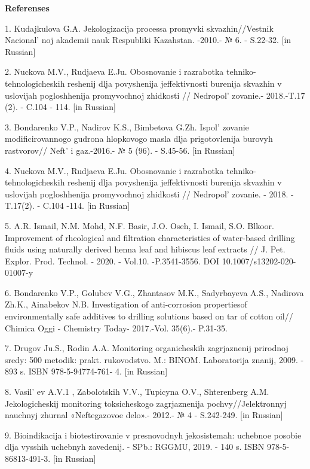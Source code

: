 \begin{center}
{\bfseries Referenses}
\end{center}

\begin{refs}
1. Kudajkulova G.A. Jekologizacija processa promyvki skvazhin//Vestnik
Nacional' noj akademii nauk Respubliki Kazahstan. -2010.-
№ 6. - S.22-32. {[}in Russian{]}

2. Nuckova M.V., Rudjaeva E.Ju. Obosnovanie i razrabotka
tehniko-tehnologicheskih reshenij dlja povy\-shenija jeffektivnosti
burenija skvazhin v uslovijah pogloshhenija promyvochnoj zhidkosti //
Nedropol' zovanie.- 2018.-T.17 (2). - C.104 - 114.
{[}in Russian{]}

3. Bondarenko V.P., Nadirov K.S., Bimbetova G.Zh.
Ispol' zovanie modificirovannogo gudrona hlopkov\-ogo masla
dlja prigotovlenija burovyh rastvorov// Neft'{} i
gaz.-2016.- № 5 (96). - S.45-56. {[}in Russian{]}

4. Nuckova M.V., Rudjaeva E.Ju. Obosnovanie i razrabotka
tehniko-tehnologicheskih reshenij dlja povy\-shenija jeffektivnosti
burenija skvazhin v uslovijah pogloshhenija promyvochnoj zhidkosti //
Nedropol' zovanie. - 2018. -T.17(2). - C.104 -114.
{[}in Russian{]}

5. A.R. Ismail, N.M. Mohd, N.F. Basir, J.O. Oseh, I. Ismail, S.O.
Blkoor. Improvement of rheological and filtration characteristics of
water-based drilling fluids using naturally derived henna leaf and
hibiscus leaf extracts // J. Pet. Explor. Prod. Technol. - 2020. -
Vol.10. -P.3541-3556. DOI 10.1007/s13202-020-01007-y

6. Bondarenko V.P., Golubev V.G., Zhantasov M.K., Sadyrbayeva A.S.,
Nadirova Zh.K., Ainabekov N.B. Investigation of anti-corrosion
propertiesof environmentally safe additives to drilling solutions based
on tar of cotton oil// Chimica Oggi - Chemistry Today- 2017.-Vol.
35(6).- P.31-35.

7. Drugov Ju.S., Rodin A.A. Monitoring organicheskih zagrjaznenij
prirodnoj sredy: 500 metodik: prakt. rukovodstvo. M.: BINOM.
Laboratorija znanij, 2009. - 893 s. ISBN 978-5-94774-761- 4. {[}in
Russian{]}

8. Vasil' ev A.V.1 , Zabolotskih V.V., Tupicyna O.V.,
Shterenberg A.M. Jekologicheskij monitoring toksicheskogo zagrjaznenija
pochvy//Jelektronnyj nauchnyj zhurnal «Neftegazovoe delo».- 2012.- № 4 -
S.242-249. {[}in Russian{]}

9. Bioindikacija i biotestirovanie v presnovodnyh jekosistemah: uchebnoe
posobie dlja vysshih uchebnyh zavedenij. - SPb.: RGGMU, 2019. - 140 s.
ISBN 978-5-86813-491-3. {[}in Russian{]}


\end{refs}
